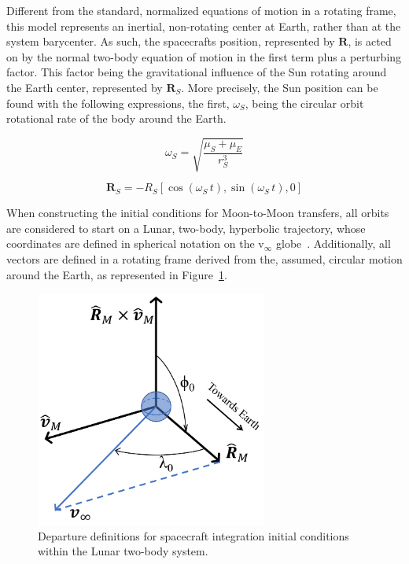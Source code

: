 \documentclass[letterpaper, paper,11pt]{AAS}	%
\begin{document}
Different from the standard, normalized equations of motion in a rotating frame, this model represents an inertial, non-rotating center at Earth, rather than at the system barycenter. As such, the spacecrafts position, represented by \(\mathbf{R}\), is acted on by the normal two-body equation of motion in the first term plus a perturbing factor. This factor being the gravitational influence of the Sun rotating around the Earth center, represented by \(\mathbf{R}_S\). More precisely, the Sun position can be found with the following expressions, the first, \(\omega_S\), being the circular orbit rotational rate of the body around the Earth.

\begin{equation}
    \omega_S = \sqrt{\frac{\mu_S + \mu_E}{r_S^3}}
    \label{eq:omS}
\end{equation}

\begin{equation}
    \mathbf{R}_S = -R_S[\cos(\omega_S\, t), \sin(\omega_S\, t), 0]
    \label{eq:RS}
\end{equation}

When constructing the initial conditions for Moon-to-Moon transfers, all orbits are considered to start on a Lunar, two-body, hyperbolic trajectory, whose coordinates are defined in spherical notation on the v\(_\infty\) globe~\cite{Strange2008}. Additionally, all vectors are defined in a rotating frame derived from the, assumed, circular motion around the Earth, as represented in Figure~\ref{fig:mooncoords}.

\begin{figure}[h]
    \centering
    \includegraphics[width=3in]{./figs/diag_moon.png}
    \caption{Departure definitions for spacecraft integration initial conditions within the Lunar two-body system.}
    \label{fig:mooncoords}
\end{figure}
\end{document}
